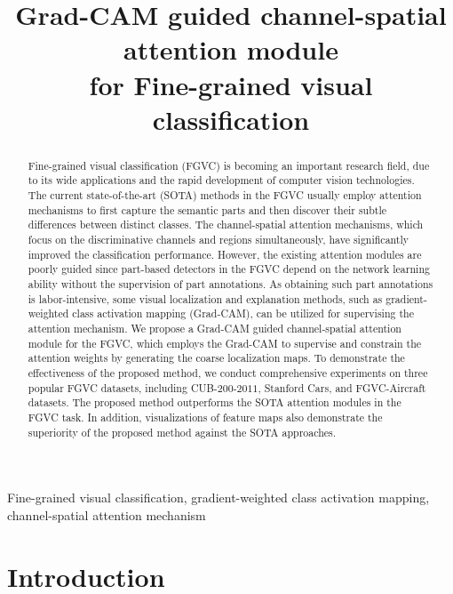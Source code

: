 \documentclass{article}
\begin{document}
\sloppy

\def\x{{\mathbf x}}
\def\L{{\cal L}}


\title{Grad-CAM guided channel-spatial attention module \\for Fine-grained visual classification }
\address{}


\maketitle


\begin{abstract}
Fine-grained visual classification (FGVC) is becoming an important research field, due to its wide applications and the rapid development of computer vision  technologies. The current state-of-the-art (SOTA) methods in the FGVC usually employ attention mechanisms to first capture the semantic parts and then discover their subtle differences between distinct classes. The channel-spatial attention mechanisms, which focus on the discriminative channels and regions simultaneously, have significantly improved the classification performance. However, the existing attention modules are poorly guided since part-based detectors in the FGVC depend on the network learning ability without the supervision of part annotations. As obtaining such part annotations is labor-intensive, some visual localization and explanation methods, such as gradient-weighted class activation mapping (Grad-CAM), can be utilized for supervising the attention mechanism. We propose a Grad-CAM guided channel-spatial attention module for the FGVC, which employs the Grad-CAM to supervise and constrain the attention weights by generating the coarse localization maps. To demonstrate the effectiveness of the proposed method, we conduct comprehensive experiments on three popular FGVC datasets, including CUB-$200$-$2011$, Stanford Cars, and FGVC-Aircraft datasets. The proposed method outperforms the SOTA attention modules in the FGVC task. In addition, visualizations of feature maps also demonstrate the superiority of the proposed method against the SOTA approaches.
\end{abstract}
\begin{keywords}
Fine-grained visual classification,  gradient-weighted class activation mapping, channel-spatial attention mechanism
\end{keywords}
\section{Introduction}
\label{sec:intro}
\end{document}
